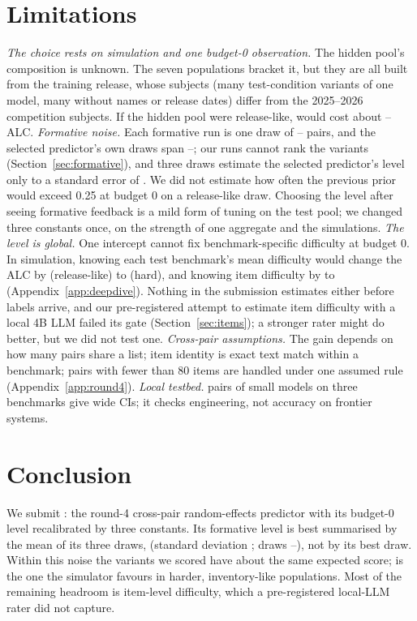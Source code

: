 \documentclass{article}
\begin{document}
\section{Limitations}
\label{sec:limitations}

\emph{The choice rests on simulation and one budget-0 observation.} The hidden pool's composition is unknown. The seven populations bracket it, but they are all built from the training release, whose subjects (many test-condition variants of one model, many without names or release dates) differ from the 2025--2026 competition subjects. If the hidden pool were release-like, \SelId{} would cost about \DdSelCostMin--\DdSelCostMax{} ALC. \emph{Formative noise.} Each formative run is one draw of \FmNPairsMin--\FmNPairsMax{} pairs, and the selected predictor's own draws span \SdAlcMin--\SdAlcMax; our runs cannot rank the variants (Section~\ref{sec:formative}), and three draws estimate the selected predictor's level only to a standard error of \SdAlcSe. We did not estimate how often the previous prior would exceed 0.25 at budget 0 on a release-like draw. Choosing the level after seeing formative feedback is a mild form of tuning on the test pool; we changed three constants once, on the strength of one aggregate and the simulations. \emph{The level is global.} One intercept cannot fix benchmark-specific difficulty at budget 0. In simulation, knowing each test benchmark's mean difficulty would change the ALC by \DdOrcABenchMean{} (release-like) to \DdOrcHardBenchMean{} (hard), and knowing item difficulty by \DdOrcAItemMean{} to \DdOrcHardItemMean{} (Appendix~\ref{app:deepdive}). Nothing in the submission estimates either before labels arrive, and our pre-registered attempt to estimate item difficulty with a local 4B LLM failed its gate (Section~\ref{sec:items}); a stronger rater might do better, but we did not test one. \emph{Cross-pair assumptions.} The gain depends on how many pairs share a list; item identity is exact text match within a benchmark; pairs with fewer than 80 items are handled under one assumed rule (Appendix~\ref{app:round4}). \emph{Local testbed.} \XpRealNPairs{} pairs of small models on three benchmarks give wide CIs; it checks engineering, not accuracy on frontier systems.

\section{Conclusion}
\label{sec:conclusion}

We submit \SelId: the round-4 cross-pair random-effects predictor with its budget-0 level recalibrated by three constants. Its formative level is best summarised by the mean of its three draws, \SdAlcMean{} (standard deviation \SdAlcSd; draws \SdAlcMin--\SdAlcMax), not by its best draw. Within this noise the variants we scored have about the same expected score; \SelId{} is the one the simulator favours in harder, inventory-like populations. Most of the remaining headroom is item-level difficulty, which a pre-registered local-LLM rater did not capture.
\end{document}
